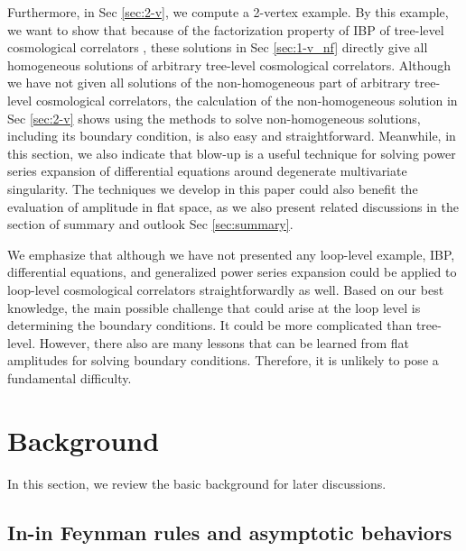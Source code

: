 \documentclass[a4paper,11pt]{article}
\begin{document}
 Furthermore, in Sec \ref{sec:2-v}, we compute a 2-vertex example. By this example, we want to show that because of the factorization property of IBP  of tree-level cosmological correlators \cite{Chen:2023iix}, these solutions in Sec \ref{sec:1-v_nf} directly give all homogeneous solutions of arbitrary tree-level cosmological correlators.  Although we have not given all solutions of the non-homogeneous part of arbitrary tree-level cosmological correlators, the calculation of the non-homogeneous solution in Sec \ref{sec:2-v} shows using the methods to solve non-homogeneous solutions, including its boundary condition, is also easy and straightforward. Meanwhile, in this section,  we also indicate that blow-up is a useful technique for solving power series expansion of differential equations around degenerate multivariate singularity. The techniques we develop in this paper could also benefit the evaluation of amplitude in flat space, as we also present related discussions in the section of summary and outlook Sec \ref{sec:summary}.
 
 We emphasize that although we have not presented any loop-level example, IBP, differential equations, and generalized power series expansion could be applied to loop-level cosmological correlators straightforwardly as well. Based on our best knowledge, the main possible challenge that could arise at the loop level is determining the boundary conditions. It could be more complicated than tree-level. 
 However, there also are many lessons that can be learned from flat amplitudes for solving boundary conditions. Therefore, it is unlikely to pose a fundamental difficulty.





\section{Background}\label{sec:not}

In this section, we review the basic background for later discussions. 

\subsection {In-in Feynman rules and asymptotic behaviors}
\end{document}

